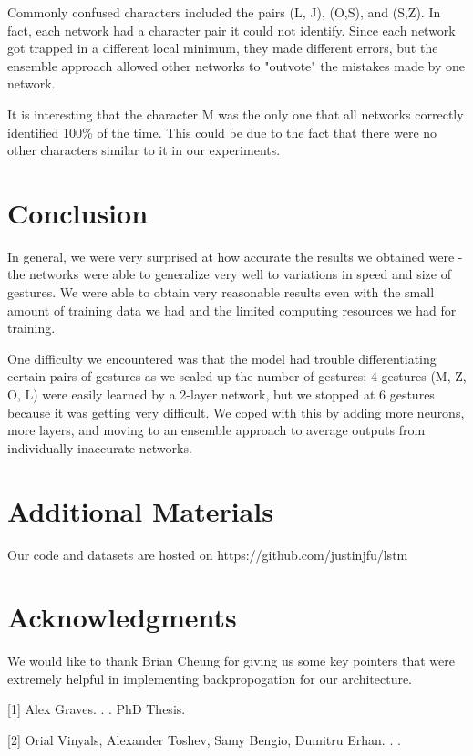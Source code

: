 \documentclass[11pt]{article}
\begin{document}
Commonly confused characters included the pairs (L, J), (O,S), 
and (S,Z). In fact, each network had a character pair it 
could not identify. Since each network got trapped in a
different local minimum, they made different errors, 
but the ensemble approach allowed other networks to
"outvote" the mistakes made by one network.

It is interesting that the character M was the only
one that all networks correctly identified 100\% of the time.
This could be due to the fact that there were no other
characters similar to it in our experiments.

\section{Conclusion}

In general, we were very surprised at how accurate the results
we obtained were - 
the networks were able to generalize very well
to variations in speed and size of gestures. We
were able to obtain very reasonable results
even with the small amount of training data we had
and the limited computing resources we had for
training.

One difficulty we encountered was that the model
had trouble differentiating certain pairs of gestures
as we scaled up the number of gestures; 4 gestures (M, Z, O, L)
were easily learned by a 2-layer network, but
we stopped at 6 gestures because it was getting
very difficult. We coped with this by adding
more neurons, more layers, and moving to an ensemble
approach to average outputs from individually
inaccurate networks.

\section*{Additional Materials}

Our code and datasets are hosted on 
https://github.com/justinjfu/lstm

\section*{Acknowledgments}

We would like to thank Brian Cheung for giving us
some key pointers that were
extremely helpful in implementing backpropogation
for our architecture.

\begin{thebibliography}{}

[1]
Alex Graves.
.
.
\newblock PhD Thesis.

[2]
Orial Vinyals, Alexander Toshev, Samy Bengio, Dumitru Erhan.
.
.

\end{thebibliography}
\end{document}
